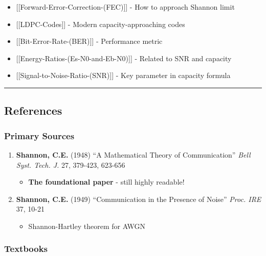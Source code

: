 \begin{itemize}
\tightlist
\item
  {[}{[}Forward-Error-Correction-(FEC){]}{]} - How to approach Shannon
  limit
\item
  {[}{[}LDPC-Codes{]}{]} - Modern capacity-approaching codes
\item
  {[}{[}Bit-Error-Rate-(BER){]}{]} - Performance metric
\item
  {[}{[}Energy-Ratios-(Es-N0-and-Eb-N0){]}{]} - Related to SNR and
  capacity
\item
  {[}{[}Signal-to-Noise-Ratio-(SNR){]}{]} - Key parameter in capacity
  formula
\end{itemize}

\begin{center}\rule{0.5\linewidth}{0.5pt}\end{center}

\subsection{\texorpdfstring{ References}{ References}}\label{references}

\subsubsection{Primary Sources}\label{primary-sources}

\begin{enumerate}
\def\labelenumi{\arabic{enumi}.}
\tightlist
\item
  \textbf{Shannon, C.E.} (1948) ``A Mathematical Theory of
  Communication'' \emph{Bell Syst. Tech. J.} 27, 379-423, 623-656

  \begin{itemize}
  \tightlist
  \item
    \textbf{The foundational paper} - still highly readable!
  \end{itemize}
\item
  \textbf{Shannon, C.E.} (1949) ``Communication in the Presence of
  Noise'' \emph{Proc. IRE} 37, 10-21

  \begin{itemize}
  \tightlist
  \item
    Shannon-Hartley theorem for AWGN
  \end{itemize}
\end{enumerate}

\subsubsection{Textbooks}\label{textbooks}

